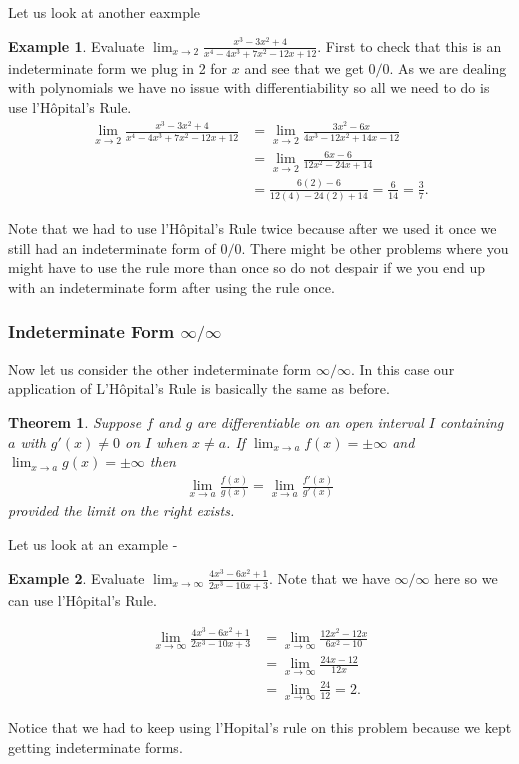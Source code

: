 \documentclass[12pt,reqno]{article}
\newtheorem{Theorem}{Theorem}
\theoremstyle{definition}
\newtheorem*{Example}{Example}
\begin{document}
Let us look at another eaxmple 
\begin{Example}
	Evaluate $\lim_{x \to 2} \frac{x^3 - 3x^2 + 4}{x^4 - 4x^3 + 7x^2 - 12x + 12}$. First to check that this is an indeterminate form we plug in 2 for $x$ and see that we get $0/0$. As we are dealing with polynomials we have no issue with differentiability so all we need to do is use l'H\^{o}pital's Rule. 
	\begin{align*}
		\lim_{x\to 2} \frac{x^3 - 3x^2 + 4}{x^4 - 4x^3 + 7x^2 - 12 x+ 12} &= \lim_{x \to 2} \frac{3x^2 - 6x}{4x^3 - 12x^2 + 14x - 12} \\
		&= \lim_{x \to 2} \frac{6x - 6}{12x^2 - 24x + 14} \\
		&= \frac{6(2) - 6}{12(4) - 24(2) + 14} = \frac{6}{14} = \frac{3}{7}.
	\end{align*}
	
	Note that we had to use l'H\^{o}pital's Rule twice because after we used it once we still had an indeterminate form of $0/0$. There might be other problems where you might have to use the rule more than once so do not despair if we you end up with an indeterminate form after using the rule once.
\end{Example}

\subsubsection{Indeterminate Form $\infty/\infty$}

Now let us consider the other indeterminate form $\infty/\infty$. In this case our application of L'H\^{o}pital's Rule is basically the same as before. 
\begin{Theorem}
	Suppose $f$ and $g$ are differentiable on an open interval $I$ containing $a$ with $g'(x) \neq 0$ on $I$ when $ x \neq a$. If $\lim_{x\to a} f(x) = \pm \infty$ and $\lim_{x\to a} g(x) = \pm \infty$ then 
	\begin{align*}
		\lim_{x \to a} \frac{f(x)}{g(x)} = \lim_{x \to a} \frac{f'(x)}{g'(x)}
	\end{align*}
	provided the limit on the right exists.
\end{Theorem}

Let us look at an example - 
\begin{Example}
	Evaluate $\lim_{x \to \infty} \frac{4x^3 - 6x^2 + 1}{2x^3 - 10 x + 3}$. Note that we have $\infty/\infty$ here so we can use l'H\^{o}pital's Rule. 
	
	\begin{align*}
		\lim_{x \to \infty} \frac{4x^3 - 6x^2 + 1}{2x^3 - 10x + 3} &= \lim_{x \to \infty}\frac{12x^2 - 12x}{6x^2 - 10} \\
			&= \lim_{x \to \infty} \frac{24x - 12}{12x} \\
			&= \lim_{x \to \infty} \frac{24}{12} = 2.
	\end{align*}
	
	Notice that we had to keep using l'Hopital's rule on this problem because we kept getting indeterminate forms.
\end{Example}
\end{document}
